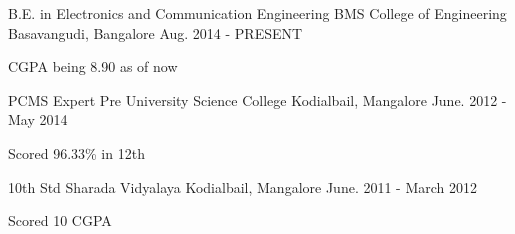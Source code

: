 \begin{cventries}
  \cventry
    {B.E. in Electronics and Communication Engineering}
    {BMS College of Engineering}
    {Basavangudi, Bangalore}
    {Aug. 2014 - PRESENT}
    {
      \begin{cvitems}
        \item {CGPA being 8.90 as of now}
      \end{cvitems}
    }
    \cventry
    {PCMS}
    {Expert Pre University Science College}
    {Kodialbail, Mangalore}
    {June. 2012 - May 2014}
    {
      \begin{cvitems}
        \item {Scored 96.33\% in 12th}
      \end{cvitems}
    }
    \cventry
    {10th Std}
    {Sharada Vidyalaya}
    {Kodialbail, Mangalore}
    {June. 2011 - March 2012}
    {
      \begin{cvitems}
        \item {Scored 10 CGPA}
      \end{cvitems}
    }
\end{cventries}
